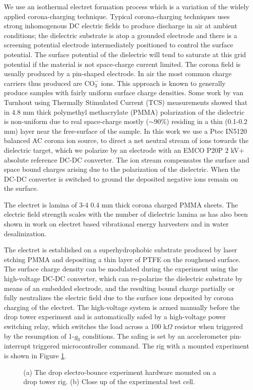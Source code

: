 \documentclass[12pt,a4paper,oneside]{book}
\begin{document}
We use an isothermal electret formation process which is a variation of the widely applied corona-charging technique. Typical corona-charging techniques uses strong inhomogenous DC electric fields to produce discharge in air at ambient conditions; the dielectric substrate is atop a grounded electrode and there is a screening potential electrode intermediately positioned to control the surface potential. The surface potential of the dielectric will tend to saturate at this grid potential if the material is not space-charge current limited. The corona field is usually produced by a pin-shaped electrode. In air the most common charge carriers thus produced are $\mbox{CO}_3^-$ ions. This approach is known to generally produce samples with fairly uniform surface charge densities. Some work\cite{van_turnhout_thermally_1975} by van Turnhout using Thermally Stimulated Current (TCS) measurements showed that in 4.8 mm thick polymethyl methacrylate (PMMA) polarization of the dielectric is non-uniform due to real space-charge mostly ($\sim$90\%) residing in a thin (0.1-0.2 mm) layer near the free-surface of the sample. In this work we use a Ptec IN5120 balanced AC corona ion source, to direct a net neutral stream of ions towards the dielectric target, which we polarize by an electrode with an EMCO P20P $2$ kV$+$ absolute reference DC-DC converter. The ion stream compensates the surface and space bound charges arising due to the polarization of the dielectric. When the DC-DC converter is switched to ground the deposited negative ions remain on the surface. 

The electret is lamina of 3-4 0.4 mm thick corona charged PMMA sheets. The electric field strength scales with the number of dielectric lamina as has also been shown in work on electret based vibrational energy harvesters\cite{wada_stacking_2012} and in water desalinization\cite{ni_desalination_2005}. 

The electret is established on a superhydrophobic substrate produced by laser etching PMMA and depositing a thin layer of PTFE on the roughened surface. The surface charge density can be modulated during the experiment using the high-voltage DC-DC converter, which can re-polarize the dielectric substrate by means of an embedded electrode, and the resulting bound charge partially or fully neutralizes the electric field due to the surface ions deposited by corona charging of the electret. The high-voltage system is armed manually before the drop tower experiment and is automatically safed by a high-voltage power switching relay, which switches the load across a 100 k$\Omega$ resistor when triggered by the resumption of 1-$g_0$ conditions. The safing is set by an accelerometer pin-interrupt triggered microcontroller command. The rig with a mounted experiment is shown in Figure \ref{fig:rig}. 
\begin{figure}
    \centering
    \def\svgwidth{\columnwidth}
        \subfloat[]{%
}

    \caption{(a) The drop electro-bounce experiment hardware mounted on a drop tower rig. (b) Close up of the experimental test cell.\label{fig:rig}}
\end{figure}
\end{document}
